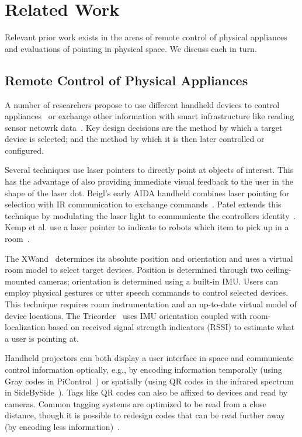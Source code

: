 \section{Related Work}
Relevant prior work exists in the areas of remote control of physical appliances and evaluations of pointing in physical space. We discuss each in turn.

\subsection{Remote Control of Physical Appliances}
A number of researchers propose to use different handheld devices to control appliances~\cite{beigl_point_1999,patel_2-way_2003,wilson_xwand:_2003,schmidt_picontrol:_2012} or exchange other information with smart infrastructure like reading sensor netowrk data~\cite{lifton_tricorder:_2007,mittal_ubicorder:_2011,costanza_sensortune:_2010}. Key design decisions are the method by which a target device is selected; and the method by which it is then later controlled or configured.

Several techniques use laser pointers to directly point at objects of interest. This has the advantage of also providing immediate visual feedback to the user in the shape of the laser dot. Beigl's early AIDA handheld combines laser pointing for selection with IR communication to exchange commands~\cite{beigl_point_1999}. Patel extends this technique by modulating the laser light to communicate the controllers identity~\cite{patel_2-way_2003}. Kemp et al. use a laser pointer to indicate to robots which item to pick up in a room~\cite{kemp_point-and-click_2008}. 

The XWand~\cite{wilson_xwand:_2003} determines its absolute position and orientation and uses a virtual room model to select target devices. Position is determined through two ceiling-mounted cameras; orientation is determined using a built-in IMU. Users can employ physical gestures or utter speech commands to control selected devices. This technique requires room instrumentation and an up-to-date virtual model of device locations. The Tricorder~\cite{lifton_tricorder:_2007} uses IMU orientation coupled with room-localization based on received signal strength indicators (RSSI) to estimate what a user is pointing at.

Handheld projectors can both display a user interface in space and communicate control information optically, e.g., by encoding information temporally (using Gray codes in PiControl~\cite{schmidt_picontrol:_2012}) or spatially (using QR codes in the infrared spectrum in SideBySide~\cite{willis_sidebyside:_2011}). Tags like QR codes can also be affixed to devices and read by cameras. Common tagging systems are optimized to be read from a close distance, though it is possible to redesign codes that can be read further away (by encoding less information)~\cite{lowcostsensing-uist13}. 

